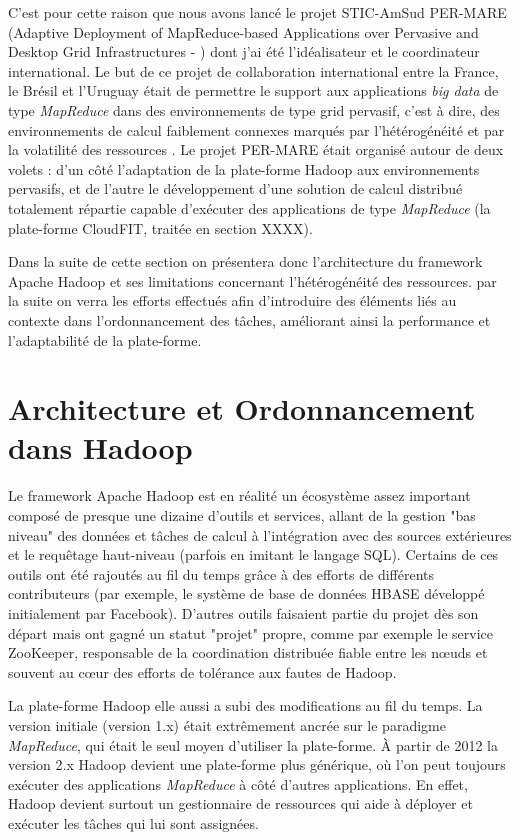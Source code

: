 C'est pour cette raison que nous avons lancé le projet STIC-AmSud PER-MARE (Adaptive Deployment of MapReduce-based Applications over Pervasive and Desktop Grid Infrastructures - \cite{PER-MARE}) dont j'ai été l'idéalisateur et le coordinateur international. Le but de ce projet de collaboration international entre la France, le Brésil et l'Uruguay était de permettre le support aux applications \textit{big data} de type \textit{MapReduce} dans des environnements de type grid pervasif, c'est à dire, des environnements de calcul faiblement connexes marqués par l'hétérogénéité et par la volatilité des ressources \cite{3PGCIC}. Le projet PER-MARE était organisé autour de deux volets : d'un côté l'adaptation de la plate-forme Hadoop aux environnements pervasifs, et de l'autre le développement d'une solution de calcul distribué totalement répartie capable d'exécuter des applications de type \textit{MapReduce} (la plate-forme CloudFIT, traitée en section XXXX).
 
Dans la suite de cette section on présentera donc l'architecture du framework Apache Hadoop et ses limitations concernant l'hétérogénéité des ressources. par la suite on verra les efforts effectués afin d'introduire des éléments liés au contexte dans l'ordonnancement des tâches, améliorant ainsi la performance et l'adaptabilité de la plate-forme. 



\section{Architecture et Ordonnancement dans Hadoop \label{subsec:ordoHadoop}}

Le framework Apache Hadoop est en réalité un écosystème assez important composé de presque une dizaine d'outils et services, allant de la gestion "bas niveau" des données et tâches de calcul à l'intégration avec des sources extérieures et le requêtage haut-niveau (parfois en imitant le langage SQL). Certains de ces outils ont été rajoutés au fil du temps grâce à des efforts de différents contributeurs (par exemple, le système de base de données HBASE développé initialement par Facebook). D'autres outils faisaient partie du projet dès son départ mais ont gagné un statut "projet" propre, comme par exemple le service ZooKeeper, responsable de la coordination distribuée fiable entre les n{\oe}uds et souvent au c{\oe}ur des efforts de tolérance aux fautes de Hadoop.

La plate-forme Hadoop elle aussi a subi des modifications au fil du temps. La version initiale (version 1.x) était extrêmement ancrée sur le paradigme \textit{MapReduce}, qui était le seul moyen d'utiliser la plate-forme. À partir de 2012 la version 2.x Hadoop devient une plate-forme plus générique, où l'on peut toujours exécuter des applications \textit{MapReduce} à côté d'autres applications. En effet, Hadoop devient surtout un gestionnaire de ressources qui aide à déployer et exécuter les tâches qui lui sont assignées.  

